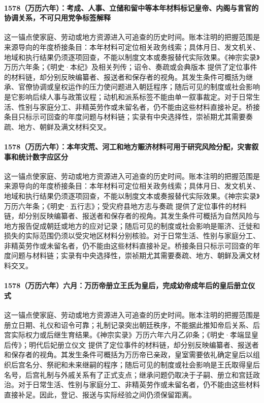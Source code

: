 \paragraph{1578（万历六年）：考成、人事、立储和留中等本年材料标记皇帝、内阁与言官的协调关系，不可只用党争标签解释} 这一锚点使家庭、劳动或地方资源进入可追查的历史时间。账本注明的把握范围是来源导向的年度桥接条目：本年材料可定位相关政务线索；具体月日、发文机关、地域和执行结果仍须逐项回查，不能以制度文本或奏报替代实际效果。《神宗实录》万历六年条；《明史·本纪》及相关列传；诏令、奏疏或会典版本 提供了定位事件的材料链，却分别反映编纂者、报送者和保存者的视角。其发生条件可概括为继承、官僚协调或皇权运作的压力使问题进入朝廷程序；随后可见的制度或社会影响是它影响后续人事与政策议程；动机和派系标签不能由单一叙事裁定。对于日常生活、性别与家庭分工、非精英劳作或未留名者，仍不能由这些材料直接补足。桥接条目只标示可回查的年度问题与材料链；实录有中央选择性，崇祯期尤其需要奏疏、地方、朝鲜及满文材料交叉。

\paragraph{1578（万历六年）：本年灾荒、河工和地方赈济材料可用于研究风险分配，灾害叙事和统计数字应区分} 这一锚点使家庭、劳动或地方资源进入可追查的历史时间。账本注明的把握范围是来源导向的年度桥接条目：本年材料可定位相关政务线索；具体月日、发文机关、地域和执行结果仍须逐项回查，不能以制度文本或奏报替代实际效果。《神宗实录》万历六年条；《明史·五行志》；受灾府县地方志与奏疏 提供了定位事件的材料链，却分别反映编纂者、报送者和保存者的视角。其发生条件可概括为自然风险与地方报告促成朝廷或地方的应对记录；随后可见的制度或社会影响是赈济、迁徙和损失的实际范围仍须以受灾地区材料分别核验。对于日常生活、性别与家庭分工、非精英劳作或未留名者，仍不能由这些材料直接补足。桥接条目只标示可回查的年度问题与材料链；实录有中央选择性，崇祯期尤其需要奏疏、地方、朝鲜及满文材料交叉。

\paragraph{1578（万历六年）六月：万历帝册立王氏为皇后，完成幼帝成年后的皇后册立仪式} 这一锚点使家庭、劳动或地方资源进入可追查的历史时间。账本注明的把握范围是册立日期、礼仪和诏令可靠；礼制记录突出朝廷秩序，不能据此推知帝后关系、后宫实际权力或后继生育结果。《神宗实录》万历六年六月乙卯条；《明史·孝端显皇后传》；明代后妃册立仪文 提供了定位事件的材料链，却分别反映编纂者、报送者和保存者的视角。其发生条件可概括为万历帝已亲政，皇室需要依礼确定皇后以组织后宫名分、祭祀和未来继嗣的程序；随后可见的制度或社会影响是王氏取得皇后名号，后宫礼制与外戚关系有了正式支点；继承问题仍取决于子嗣、册立和宫廷政治。对于日常生活、性别与家庭分工、非精英劳作或未留名者，仍不能由这些材料直接补足。因此，登记、报送与实际经验之间仍须保留距离。

